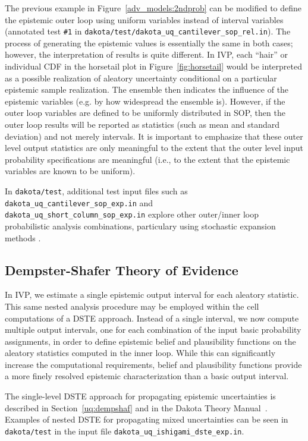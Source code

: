 The previous example in Figure~\ref{adv_models:2ndprob} can be
modified to define the epistemic outer loop using uniform variables
instead of interval variables (annotated test \texttt{\#1} in
\texttt{dakota/test/dakota\_uq\_cantilever\_sop\_rel.in}).  The process of
generating the epistemic values is essentially the same in both cases;
however, the interpretation of results is quite different.  In IVP,
each ``hair'' or individual CDF in the horsetail plot in
Figure~\ref{fig:horsetail} would be interpreted as a possible
realization of aleatory uncertainty conditional on a particular
epistemic sample realization.  The ensemble then indicates the
influence of the epistemic variables (e.g. by how widespread the
ensemble is).  However, if the outer loop variables are defined to be
uniformly distributed in SOP, then the outer loop results will be
reported as statistics (such as mean and standard deviation) and not
merely intervals.  It is important to emphasize that these outer level
output statistics are only meaningful to the extent that the outer
level input probability specifications are meaningful (i.e., to the
extent that the epistemic variables are known to be uniform).

In \texttt{dakota/test}, additional test input files such as
\texttt{dakota\_uq\_cantilever\_sop\_exp.in} and\\
\texttt{dakota\_uq\_short\_column\_sop\_exp.in} explore other outer/inner
loop probabilistic analysis combinations, particulary using stochastic
expansion methods .

\subsection{Dempster-Shafer Theory of Evidence} \label{adv_models:mixed_uq:dste}

In IVP, we estimate a single epistemic output interval for each
aleatory statistic.  This same nested analysis procedure may be
employed within the cell computations of a DSTE approach.  Instead of
a single interval, we now compute multiple output intervals, one for
each combination of the input basic probability assignments, in order
to define epistemic belief and plausibility functions on the aleatory
statistics computed in the inner loop.  While this can significantly
increase the computational requirements, belief and plausibility
functions provide a more finely resolved epistemic characterization
than a basic output interval.

The single-level DSTE approach for propagating epistemic uncertainties
is described in Section~\ref{uq:dempshaf} and in the Dakota Theory
Manual~\cite{TheoMan}.  Examples of nested DSTE for propagating mixed
uncertainties can be seen in \texttt{dakota/test} in the input file
\texttt{dakota\_uq\_ishigami\_dste\_exp.in}.



